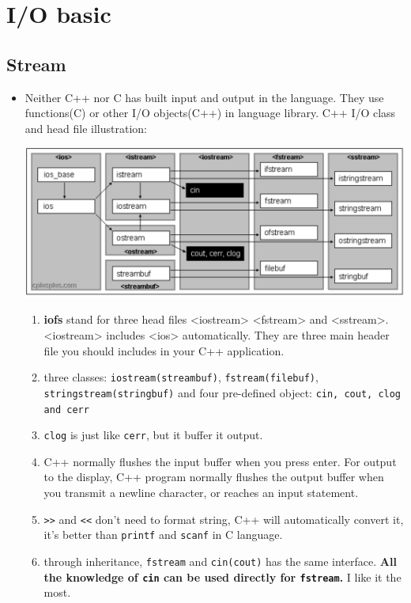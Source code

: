 \documentclass[a4paper,11pt,twoside]{book}
\begin{document}
\section{I/O basic}

\subsection{Stream}

\begin{itemize}
	\item Neither C++ nor C has built input and output in the language. They use functions(C) or other I/O objects(C++) in language library. C++ I/O class and head file illustration: 
	\begin{center}
			\includegraphics[scale=0.5]{pics/io.png}
	\end{center}

	\begin{enumerate}
		
		\item \textbf{iofs} stand for three head files <iostream> <fstream> and <sstream>. <iostream> includes <ios> automatically. They are three main header file you should includes in your C++ application.
		
		\item three classes: \texttt{iostream(streambuf)}, \texttt{fstream(filebuf)}, \texttt{stringstream(stringbuf)} and four pre-defined object: \texttt{cin, cout, clog and cerr} 
		
		\item \texttt{clog} is just like \texttt{cerr}, but it buffer it output.
		
		\item C++ normally flushes the input buffer when you press enter. For output to the display, C++ program normally flushes the output buffer when you transmit a newline character, or reaches an input statement.
		
		\item \verb=>>= and \verb=<<= don't need to format string,  C++ will automatically convert it, it's better than \texttt{printf} and \texttt{scanf} in C language.
		
		\item through inheritance, \texttt{fstream} and \texttt{cin(cout)} has the same interface. \textbf{All the knowledge of \texttt{cin} can be used directly for \texttt{fstream}.} I like it the most.
	\end{enumerate}
	
\end{itemize}
\end{document}
